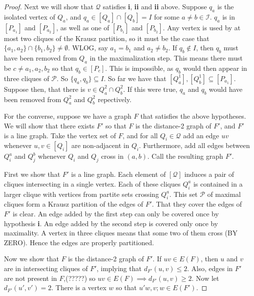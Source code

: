 \begin{proof}
Next we will show that $\mathcal{Q}$ satisfies \textbf{i}, \textbf{ii} and \textbf{ii} above. 
%
Suppose $q_a$ is the isolated vertex of $Q_a$, and $q_a \in [Q_a] \cap [Q_b] = I$ for some $a \neq b \in \mathcal{I}$.
%
$q_a$ is in $[P_{a_1}]$ and $[P_{a_2}]$, as well as one of $[P_{b_1}]$ and $[P_{b_2}]$.  
%
Any vertex is used by at most two cliques of the Krausz partition, so it must be the case that $\{a_1, a_2\} \cap \{b_1, b_2\} \neq \emptyset$.  
%
WLOG, say $a_1 = b_1$ and $a_2 \neq b_2$.  
%
If $q_b \notin I$, then $q_b$ must have been removed from $Q_a$ in the maximalization step.
%
This means there must be $c \neq a_1, a_2, b_2$ so that $q_b \in [P_c]$.
%
This is impossible, as $q_b$ would then appear in three cliques of $\mathcal{P}$. 
%
So $\{q_a, q_b\} \subseteq I$.
%
So far we have that $[Q_a^1], [Q_b^1] \subseteq [P_{a_1}]$.
%
Suppose then, that there is $v \in Q_a^2 \cap Q_b^2$.
%
If this were true, $q_a$ and $q_b$ would have been removed from $Q_a^2$ and $Q_b^2$ repectively.
%

For the converse, suppose we have a graph $F$ that satisfies the above hypotheses.  
%
We will show that there exists $F'$ so that $F$ is the distance-2 graph of $F'$, and $F'$ is a line graph.
%
Take the vertex set of $F$, and for all $Q_i \in \mathcal{Q}$ add an edge $uv$ whenever $u,v \in [Q_i]$ are non-adjacent in $Q_i$.  
%
Furthermore, add all edges between $Q_i^a$ and $Q_j^b$ whenever $Q_i$ and $Q_j$ cross in $(a,b)$.
%
Call the resulting graph $F'$.
%

First we show that $F'$ is a line graph.
%
Each element of $[\mathcal{Q}]$ induces a pair of cliques intersecting in a single vertex.
%
Each of these cliques $Q_i^a$ is contained in a larger clique with vertices from partite sets crossing $Q_i^a$.  
%
This set $\mathcal{P}$ of maximal cliques form a Krausz partition of the edges of $F'$.
%
That they cover the edges of $F'$ is clear.
%
An edge added by the first step can only be covered once by hypothesis \textbf{i}.
%
An edge added by the second step is covered only once by maximality.
%
A vertex in three cliques means that some two of them cross (BY ZERO).
%
Hence the edges are properly partitioned.

Now we show that $F$ is the distance-2 graph of $F'$.  
%
If $uv \in E(F)$, then $u$ and $v$ are in intersecting cliques of $F'$, implying that $d_{F'}(u,v)\leq 2$.
%
Also, edges in $F'$ are not present in $F$,(?????) so $uv \in E(F) \implies d_{F'}(u,v) \geq 2$. 
%
Now let $d_{F'}(u',v') = 2$.  There is a vertex $w$ so that $u'w, v;w \in E(F')$.  

\end{proof}


